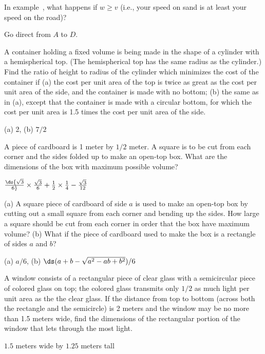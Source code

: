 \begin{exercises}
\begin{exercise}
In example~, what happens if
$w\ge v$ (i.e., your speed on sand is at least your speed on the
road)?
\begin{answer} Go direct from $A$ to $D$.
\end{answer}\end{exercise}

\begin{exercise}
A container holding a fixed volume is being made in the shape of a cylinder
with a hemispherical top.  (The hemispherical top has the same radius
as the cylinder.)  Find the ratio of height to radius of the cylinder which
minimizes the cost of the container if (a) the cost per unit area of the
top is twice as great as the cost per unit area of the side, and the
container is made with no bottom; (b) the same as in (a), except that the
container is made with a circular bottom, for which the cost per unit area is
1.5 times the cost per unit area of the side.
\begin{answer} (a) 2, (b) $7/2$
\end{answer}\end{exercise}

\begin{exercise} A piece of cardboard is 1 meter by $1/2$ meter. A square is
to be cut from each corner and the sides folded up to make an open-top
box. What are the dimensions of the box with maximum possible volume?
\begin{answer} $\ds{\sqrt3\over6}\times{\sqrt3\over6}+{1\over2}\times
{1\over4}-{\sqrt3\over 12}$
\end{answer}\end{exercise}


\begin{exercise} (a) A square piece of cardboard of side $a$ is used to make
an open-top box by cutting out a small square from each corner and
bending up the sides.  How large a square should be cut from each
corner in order that the box have maximum volume? (b) What if the
piece of cardboard used to make the box is a rectangle of sides $a$
and $b$?  
\begin{answer} (a) $a/6$, (b) $\ds (a+b-\sqrt{a^2-ab+b^2})/6$
\end{answer}\end{exercise} 
\label{exercise: cardboard box}

\begin{exercise} A window consists of a rectangular piece of clear glass with
a semicircular piece of colored glass on top; the
colored glass transmits only $1/2$ as much light per unit area as the
the clear glass.  If the distance from
top to bottom (across both the rectangle and the semicircle) is
2 meters and the window may be no more than 1.5 meters wide, find the
dimensions of the rectangular portion of the window that lets through
the most light.
\begin{answer} $1.5$ meters wide by $1.25$ meters tall
\end{answer}\end{exercise} 


\end{exercises}
